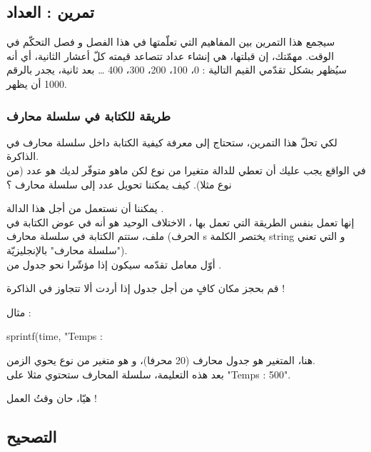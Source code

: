 \subsection{تمرين : العداد}

سيجمع هذا التمرين بين المفاهيم التي تعلّمتها في هذا الفصل و فصل التحكّم في الوقت. مهمّتك، إن قبلتها، هي إنشاء عداد تتصاعد قيمته كلّ أعشار الثانية، أي أنه سيُظهر بشكل تقدّمي القيم التالية : 0، 100، 200، 300، 400 \dots
بعد ثانية، يجدر بالرقم 1000 أن يظهر.

\subsubsection{طريقة للكتابة في سلسلة محارف}

لكي تحلّ هذا التمرين، ستحتاج إلى معرفة كيفية الكتابة داخل سلسلة محارف في الذاكرة.\\
في الواقع يجب عليك أن تعطي للدالة
متغيرا من نوع
لكن ماهو متوفّر لديك هو عدد (من نوع
مثلا). كيف يمكننا تحويل عدد إلى سلسلة محارف ؟

يمكننا أن نستعمل من أجل هذا الدالة
.\\
إنها تعمل بنفس الطريقة التي تعمل بها
،
الاختلاف الوحيد هو أنه في عوض الكتابة في ملف، ستتم الكتابة في سلسلة محارف (الحرف
\textenglish{s}
يختصر الكلمة
\textenglish{string}
و التي تعني "سلسلة محارف" بالإنجليزيّة).\\
أوّل معامل تقدّمه سيكون إذا مؤشّرا نحو جدول من
.

\begin{critical}
قم بحجز مكان كافٍ من أجل جدول
إذا أردت ألا تتجاوز في الذاكرة !
\end{critical}

مثال :

\begin{Csource}
sprintf(time, "Temps : %
\end{Csource}

هنا، المتغير
هو جدول محارف (20 محرفا)، و
هو متغير من نوع
يحوي الزمن.\\
بعد هذه التعليمة، سلسلة المحارف 
ستحتوي مثلا على
"\textenglish{Temps : 500}".

هيّا، حان وقتُ العمل !

\subsection{التصحيح}

